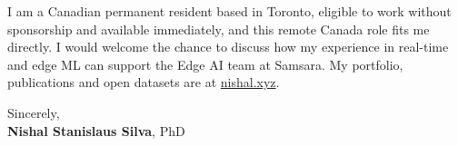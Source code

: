\documentclass[11pt]{article}
\newcommand{\clName}{Nishal Stanislaus Silva}
\newcommand{\clSite}{https://nishal.xyz}
\newcommand{\clTeam}{the Edge AI team}
\begin{document}
I am a Canadian permanent resident based in Toronto, eligible to work without sponsorship and available immediately, and this remote Canada role fits me directly. I would welcome the chance to discuss how my experience in real-time and edge ML can support \clTeam{} at Samsara. My portfolio, publications and open datasets are at \href{\clSite}{nishal.xyz}.

\vspace{12pt}
Sincerely,\\[2pt]
\textbf{\clName}, PhD
\end{document}
